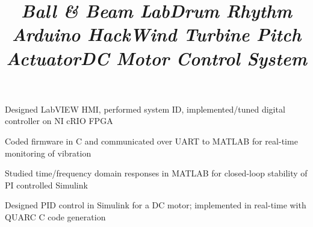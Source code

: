 \documentclass[mm]{res}
\begin{document}
\begin{resume}

\title{\textsl{Ball \& Beam Lab}}
\begin{position}
\tb Designed LabVIEW HMI, performed system ID, implemented/tuned digital controller on NI cRIO FPGA
\end{position}


\title{\textsl{Drum Rhythm Arduino Hack}}
\begin{position}
\tb Coded firmware in C and communicated over UART to MATLAB for real-time monitoring of vibration
\end{position}

\title{\textsl{Wind Turbine Pitch Actuator}}
\begin{position}
\tb Studied time/frequency domain responses in MATLAB for closed-loop stability of PI controlled Simulink
\end{position}


\title{\textsl{DC Motor Control System}}
\begin{position}
\tb Designed PID control in Simulink for a DC motor; implemented in real-time with QUARC C code generation
\end{position}


\end{resume}
\end{document}
